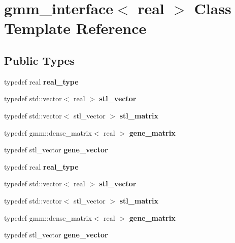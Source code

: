 \hypertarget{classgmm__interface}{}\section{gmm\+\_\+interface$<$ real $>$ Class Template Reference}
\label{classgmm__interface}
\subsection*{Public Types}
\begin{DoxyCompactItemize}
\item 
\mbox{\label{classgmm__interface_a1d5f0a210c808c57dcde7942d5fd3d58}} 
typedef real {\bfseries real\+\_\+type}
\item 
\mbox{\label{classgmm__interface_af2a482efc9416914452cfaa6357b8f6b}} 
typedef std\+::vector$<$ real $>$ {\bfseries stl\+\_\+vector}
\item 
\mbox{\label{classgmm__interface_a4ac5b5e30b45264a3c7dc280db5c851e}} 
typedef std\+::vector$<$ stl\+\_\+vector $>$ {\bfseries stl\+\_\+matrix}
\item 
\mbox{\label{classgmm__interface_aa7f6a4ef4dd2a41810df9ae7c3c8d69f}} 
typedef gmm\+::dense\+\_\+matrix$<$ real $>$ {\bfseries gene\+\_\+matrix}
\item 
\mbox{\label{classgmm__interface_a2ae07696d9e19dd6aeb67c38e00f6e2b}} 
typedef stl\+\_\+vector {\bfseries gene\+\_\+vector}
\item 
\mbox{\label{classgmm__interface_a1d5f0a210c808c57dcde7942d5fd3d58}} 
typedef real {\bfseries real\+\_\+type}
\item 
\mbox{\label{classgmm__interface_af2a482efc9416914452cfaa6357b8f6b}} 
typedef std\+::vector$<$ real $>$ {\bfseries stl\+\_\+vector}
\item 
\mbox{\label{classgmm__interface_a4ac5b5e30b45264a3c7dc280db5c851e}} 
typedef std\+::vector$<$ stl\+\_\+vector $>$ {\bfseries stl\+\_\+matrix}
\item 
\mbox{\label{classgmm__interface_aa7f6a4ef4dd2a41810df9ae7c3c8d69f}} 
typedef gmm\+::dense\+\_\+matrix$<$ real $>$ {\bfseries gene\+\_\+matrix}
\item 
\mbox{\label{classgmm__interface_a2ae07696d9e19dd6aeb67c38e00f6e2b}} 
typedef stl\+\_\+vector {\bfseries gene\+\_\+vector}
\end{DoxyCompactItemize}
